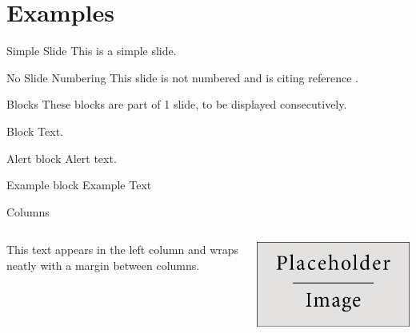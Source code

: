\section{Examples}

\begin{frame}[headless]{}
	\sectionpage
\end{frame}

\begin{frame}{Simple Slide}
	This is a simple slide.
\end{frame}

\begin{frame}[noframenumbering]{No Slide Numbering}
	This slide is not numbered and is citing reference \cite{knuth74}.
\end{frame}

\begin{frame}{Blocks}
	These blocks are part of 1 slide, to be displayed consecutively.
	\begin{block}{Block}
		Text.
	\end{block}
	\pause %
	\begin{alertblock}{Alert block}
		Alert \alert{text}.
	\end{alertblock}
	\pause %
	\begin{exampleblock}{Example block}
		Example Text
	\end{exampleblock}
\end{frame}

\begin{frame}{Columns}
	\begin{columns}
			This text appears in the left column and wraps neatly with a margin between columns.
		
			\includegraphics[width=\linewidth]{Assets/placeholder.jpg}
	\end{columns}
\end{frame}


